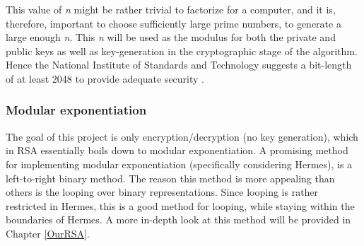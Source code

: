 
This value of \textit{n} might be rather trivial to factorize for a computer, and it is, therefore, important to choose sufficiently large prime numbers, to generate a large enough \textit{n}. This \textit{n} will be used as the modulus for both the private and public keys as well as key-generation in the cryptographic stage of the algorithm. Hence the National Institute of Standards and Technology suggests a bit-length of at least 2048 to provide adequate security \cite{RecommendationForKeyManagement}. 






\subsubsection*{Modular exponentiation}
The goal of this project is only encryption/decryption (no key generation), which in RSA essentially boils down to modular exponentiation. A promising method for implementing modular exponentiation (specifically considering Hermes), is a left-to-right binary method. The reason this method is more appealing than others is the looping over binary representations. Since looping is rather restricted in Hermes, this is a good method for looping, while staying within the boundaries of Hermes. A more in-depth look at this method will be provided in Chapter \ref{OurRSA}. 


